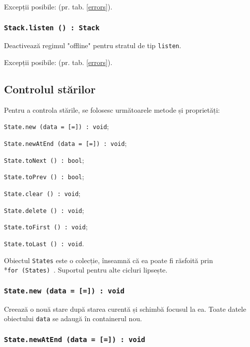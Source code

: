 Excepții posibile:  (pr. tab. \ref{errors}).

\subsubsection{\texttt{Stack.listen () : Stack}}

Deactivează regimul "offline" pentru stratul de tip \texttt{listen}.

Excepții posibile:  (pr. tab. \ref{errors}).

\subsection{Controlul stărilor}

Pentru a controla stările, se folosesc următoarele metode și proprietăți:
\begin{icItems}
	\item \texttt{State.new (data = [=]) : void};
	\item \texttt{State.newAtEnd (data = [=]) : void};
	\item \texttt{State.toNext () : bool};
	\item \texttt{State.toPrev () : bool};
	\item \texttt{State.clear () : void};
	\item \texttt{State.delete () : void};
	\item \texttt{State.toFirst () : void};
	\item \texttt{State.toLast () : void}.
\end{icItems}

Obiectul \texttt{States} este o colecție, înseamnă că ea poate fi răsfoită prin \\*\texttt{for (States) {}}. Suportul pentru alte cicluri lipsește.

\subsubsection{\texttt{State.new (data = [=]) : void}}

Creează o nouă stare după starea curentă și schimbă focusul la ea. Toate datele obiectului \texttt{data} se adaugă în containerul nou.

\subsubsection{\texttt{State.newAtEnd (data = [=]) : void}}

